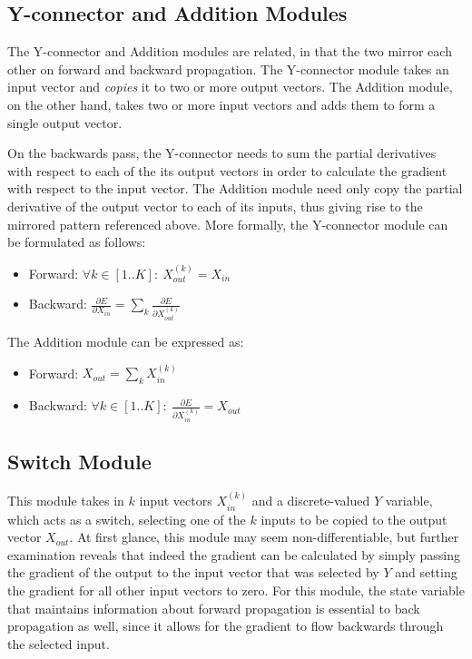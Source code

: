 \subsection{Y-connector and Addition Modules}

The Y-connector and Addition modules are related, in that the two mirror each other on forward and backward propagation.
The Y-connector module takes an input vector and \textit{copies} it to two or more output vectors.
The Addition module, on the other hand, takes two or more input vectors and adds them to form a single output vector.

On the backwards pass, the Y-connector needs to sum the partial derivatives with respect to each of the its output vectors in order to calculate the gradient with respect to the input vector.
The Addition module need only copy the partial derivative of the output vector to each of its inputs, thus giving rise to the mirrored pattern referenced above.
More formally, the Y-connector module can be formulated as follows:
\begin{itemize}
    \item Forward: $\forall k \in [1..K]: \ X_{out}^{(k)} = X_{in}$
    \item Backward: $\frac{\partial E}{\partial X_{in}} = \sum_k{\frac{\partial E}{\partial X_{out}^{(k)}}}$
\end{itemize}
The Addition module can be expressed as:
\begin{itemize}
    \item Forward: $X_{out} = \sum_k{X_{in}^{(k)}}$
    \item Backward: $\forall k \in [1..K]: \ \frac{\partial E}{\partial X_{in}^{(k)}} = X_{out}$
\end{itemize}

\subsection{Switch Module}

This module takes in $k$ input vectors $X_{in}^{(k)}$ and a discrete-valued $Y$ variable, which acts as a switch, selecting one of the $k$ inputs to be copied to the output vector $X_{out}$.
At first glance, this module may seem non-differentiable, but further examination reveals that indeed the gradient can be calculated by simply passing the gradient of the output to the input vector that was selected by $Y$ and setting the gradient for all other input vectors to zero.
For this module, the state variable that maintains information about forward propagation is essential to back propagation as well, since it allows for the gradient to flow backwards through the selected input.

